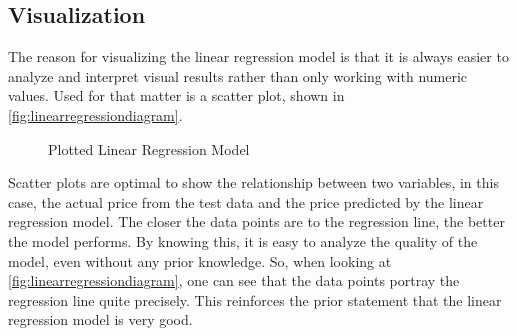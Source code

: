 \subsection{Visualization}
The reason for visualizing the linear regression model is that it is always easier to analyze and interpret visual 
results rather than only working with numeric values.
Used for that matter is a scatter plot, shown in \autoref{fig:linearregressiondiagram}. 
\begin{figure}[h]
    \caption{Plotted Linear Regression Model}
    \label{fig:linearregressiondiagram}
\end{figure}
\par
Scatter plots are optimal to show the relationship between two variables, in this case, the actual price from the test data 
and the price predicted by the linear regression model. The closer the data points are to the regression line, the 
better the model performs. By knowing this, it is easy to analyze the quality of the model, even without any prior knowledge.
So, when looking at \autoref{fig:linearregressiondiagram}, one can see that the data points portray the regression line 
quite precisely. This reinforces the prior statement that the linear regression model is very good.

